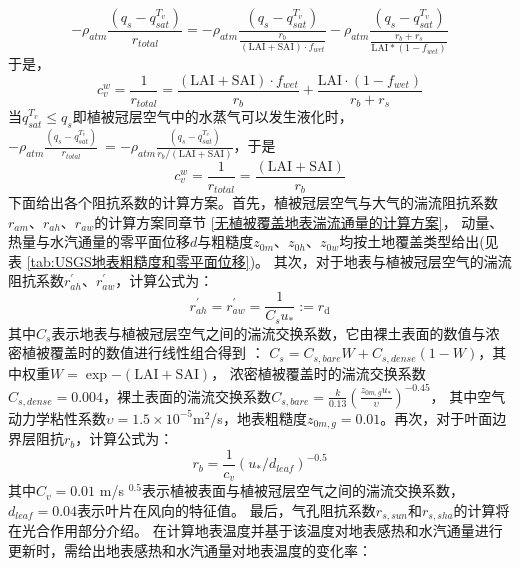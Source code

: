 \begin{equation}
-\rho_{atm} \frac{\left(q_{s}-q_{s a t}^{T_{v}}\right)}{r_{{total }}}=-\rho_{atm} 
\frac{\left(q_{s}-q_{s a t}^{T_{v}}\right)}{\frac{r_{b}}{(\text {LAI}+\text {SAI}) \cdot f_{{wet }}}}-\rho_{atm} \frac{\left(q_{s}-q_{s a t}^{T_{v}}\right)}{\frac{r_{b}+r_{s}}{\text {LAI} *\left(1-f_{{wet }}\right)}}
\end{equation}
于是，
\begin{equation}
c_{v}^{w}=\frac{1}{r_{{total }}}=\frac{(\text {LAI}+\text {SAI}) \cdot f_{{wet }}}{r_{b}}+\frac{\text {LAI} \cdot \left(1-f_{{wet}}\right)}{r_{b}+r_{s}}
\end{equation}
当$q_{sat}^{T_v}\le q_s$即植被冠层空气中的水蒸气可以发生液化时，
$-\rho_{atm}\frac{\left(q_s-q_{sat}^{T_v}\right)}{r_{total}}\ =-\rho_{atm}\frac{\left(q_s-q_{sat}^{T_v}\right)}{r_b/\left(\text {LAI}+\text {SAI}\right)}$，于是
\begin{equation}
c_{v}^{w}=\frac{1}{r_{{total }}}=\frac{(\text {LAI}+\text {SAI})}{r_{b}}
\end{equation}
下面给出各个阻抗系数的计算方案。首先，植被冠层空气与大气的湍流阻抗系数$r_{am}$、$r_{ah}$、$r_{aw}$的计算方案同章节 \ref{无植被覆盖地表湍流通量的计算方案}，
动量、热量与水汽通量的零平面位移$d$与粗糙度$z_{0m}$、$z_{0h}$、$z_{0w}$均按土地覆盖类型给出(见
表 \ref{tab:USGS地表粗糙度和零平面位移})。
其次，对于地表与植被冠层空气的湍流阻抗系数$r_{ah}^\prime$、$r_{aw}^\prime$，计算公式为：
\begin{equation}
r_{a h}^{\prime}=r_{a w}^{\prime}=\frac{1}{C_{s} u_{*}}:=r_{\mathrm{d}}
\end{equation}
其中$C_s$表示地表与植被冠层空气之间的湍流交换系数，它由裸土表面的数值与浓密植被覆盖时的数值进行线性组合得到 \citep{zeng2005vegetation}：
$C_s=C_{s,bare}W+C_{s,dense}\left(1-W\right)$，其中权重$W=\exp {-\left(\text{LAI}+\text{SAI}\right)}$，
浓密植被覆盖时的湍流交换系数$C_{s,dense}=0.004$，裸土表面的湍流交换系数$C_{s,bare}=\frac{k}{0.13}\left(\frac{z_{0m,g}u_\ast}{\upsilon}\right)^{-0.45}$，
其中空气动力学粘性系数$\upsilon=1.5\times{10}^{-5}$m$^2$/s，地表粗糙度$z_{0m,g}=0.01$。再次，对于叶面边界层阻抗$r_b$，计算公式为：
\begin{equation}
r_{b}=\frac{1}{c_{v}}\left(u_{*} / d_{{leaf }}\right)^{-0.5}
\end{equation}
其中$C_v=0.01$ m/s $^{0.5}$表示植被表面与植被冠层空气之间的湍流交换系数，$d_{leaf}=0.04$表示叶片在风向的特征值。
最后，气孔阻抗系数$r_{s,sun}$和$r_{s,sha}$的计算将在光合作用部分介绍。
在计算地表温度并基于该温度对地表感热和水汽通量进行更新时，需给出地表感热和水汽通量对地表温度的变化率：
